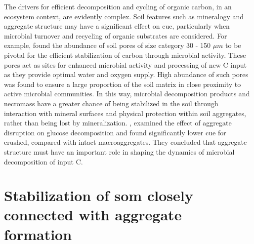 	The drivers for efficient decomposition and cycling of organic carbon, in an ecosystem context, are evidently complex.
	Soil features such as mineralogy and aggregate structure may have a significant effect on \gls{cue}, particularly when microbial turnover and recycling of organic substrates are considered. For example, \citet{kravchenko2019} found the abundance of soil pores of size category 30 - 150 $ \mu m $ to be pivotal for the efficient stabilization of carbon through microbial activity. These pores act as sites for enhanced microbial activity and processing of new C input as they provide optimal water and oxygen supply. High abundance of such pores was found to ensure a large proportion of the soil matrix in close proximity to active microbial communities. In this way, microbial decomposition products and necromass have a greater chance of being stabilized in the soil through interaction with mineral surfaces and physical protection within soil aggregates, rather than being lost by mineralization.
	\citet{tian2015}, examined the effect of aggregate disruption on glucose decomposition and found significantly lower \gls{cue} for crushed, compared with intact macroaggregates. They concluded that aggregate structure must have an important role in shaping the dynamics of microbial decomposition of input C.

\section{Stabilization of \gls{som} closely connected with aggregate formation}

